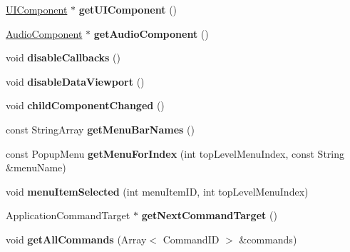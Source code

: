 \begin{DoxyCompactItemize}
\item 
\hypertarget{classUIComponent_a398c3ed66856fece160315e40e48f47c}{\hyperlink{classUIComponent}{U\-I\-Component} $\ast$ {\bfseries get\-U\-I\-Component} ()}\label{classUIComponent_a398c3ed66856fece160315e40e48f47c}

\item 
\hypertarget{classUIComponent_aaad1ad4aba78ee21389c685d1804bb06}{\hyperlink{classAudioComponent}{Audio\-Component} $\ast$ {\bfseries get\-Audio\-Component} ()}\label{classUIComponent_aaad1ad4aba78ee21389c685d1804bb06}

\item 
\hypertarget{classUIComponent_a38a23101bdc53813595dc71f54049e2b}{void {\bfseries disable\-Callbacks} ()}\label{classUIComponent_a38a23101bdc53813595dc71f54049e2b}

\item 
\hypertarget{classUIComponent_ad14aea4dcdb95649748ba5f9575858e9}{void {\bfseries disable\-Data\-Viewport} ()}\label{classUIComponent_ad14aea4dcdb95649748ba5f9575858e9}

\item 
\hypertarget{classUIComponent_a59aefb9581d3e44318a2d1f2a446a31f}{void {\bfseries child\-Component\-Changed} ()}\label{classUIComponent_a59aefb9581d3e44318a2d1f2a446a31f}

\item 
\hypertarget{classUIComponent_a00b52a772ffea55b942c0def87be1ea9}{const String\-Array {\bfseries get\-Menu\-Bar\-Names} ()}\label{classUIComponent_a00b52a772ffea55b942c0def87be1ea9}

\item 
\hypertarget{classUIComponent_ad401a7a0c4096f012e19f8fc4cc5021b}{const Popup\-Menu {\bfseries get\-Menu\-For\-Index} (int top\-Level\-Menu\-Index, const String \&menu\-Name)}\label{classUIComponent_ad401a7a0c4096f012e19f8fc4cc5021b}

\item 
\hypertarget{classUIComponent_a011b702a81af51214ec797416cfe5b6c}{void {\bfseries menu\-Item\-Selected} (int menu\-Item\-I\-D, int top\-Level\-Menu\-Index)}\label{classUIComponent_a011b702a81af51214ec797416cfe5b6c}

\item 
\hypertarget{classUIComponent_ad0b6f699bb84ccbb2c341940845e49b9}{Application\-Command\-Target $\ast$ {\bfseries get\-Next\-Command\-Target} ()}\label{classUIComponent_ad0b6f699bb84ccbb2c341940845e49b9}

\item 
\hypertarget{classUIComponent_a292cf43e909207876e2dac2d70f54635}{void {\bfseries get\-All\-Commands} (Array$<$ Command\-I\-D $>$ \&commands)}\label{classUIComponent_a292cf43e909207876e2dac2d70f54635}


\end{DoxyCompactItemize}

